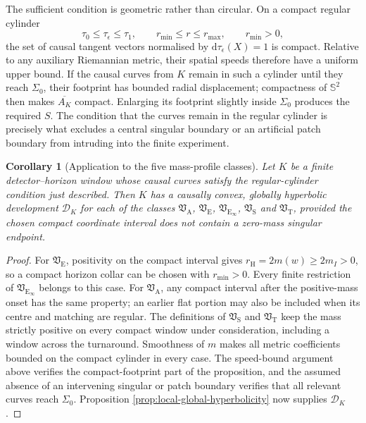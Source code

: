 \documentclass[11pt,a4paper]{article}
\newtheorem{corollary}[theorem]{Corollary}
\theoremstyle{definition}
\theoremstyle{remark}
\newcommand{\D}{\mathcal D}
\newcommand{\dd}{\mathrm d}
\begin{document}
	The sufficient condition is geometric rather than circular.  On a compact
	regular cylinder
	\begin{equation}
		\tau_0\leq\tau_\epsilon\leq\tau_1,
		\qquad r_{\min}\leq r\leq r_{\max},
		\qquad r_{\min}>0,
		\label{eq:regular-causal-cylinder}
	\end{equation}
	the set of causal tangent vectors normalised by
	$\dd\tau_\epsilon(X)=1$ is compact.  Relative to any auxiliary Riemannian
	metric, their spatial speeds therefore have a uniform upper bound.  If the
	causal curves from $K$ remain in such a cylinder until they reach
	$\Sigma_0$, their footprint has bounded radial displacement; compactness of
	$\mathbb S^2$ then makes $\overline{A_K}$ compact.  Enlarging its footprint
	slightly inside $\Sigma_0$ produces the required $S$.  The condition that
	the curves remain in the regular cylinder is precisely what excludes a
	central singular boundary or an artificial patch boundary from intruding
	into the finite experiment.
	
	\begin{corollary}[Application to the five mass-profile classes]
		\label{cor:mass-class-hyperbolicity}
		Let $K$ be a finite detector--horizon window whose causal curves satisfy the
		regular-cylinder condition just described.  Then $K$ has a causally convex,
		globally hyperbolic development $\D_K$ for each of the classes
		$\mathfrak V_{\mathrm A}$, $\mathfrak V_{\mathrm E}$,
		$\mathfrak V_{\mathrm E_\infty}$, $\mathfrak V_{\mathrm S}$ and
		$\mathfrak V_{\mathrm T}$, provided the chosen compact coordinate interval
		does not contain a zero-mass singular endpoint.
	\end{corollary}
	
	\begin{proof}
		For $\mathfrak V_{\mathrm E}$, positivity on the compact interval gives
		$r_{\mathrm H}=2m(w)\geq2m_I>0$, so a compact horizon collar can be chosen
		with $r_{\min}>0$.  Every finite restriction of
		$\mathfrak V_{\mathrm E_\infty}$ belongs to this case.  For
		$\mathfrak V_{\mathrm A}$, any compact interval after the positive-mass onset
		has the same property; an earlier flat portion may also be included when its
		centre and matching are regular.  The definitions of
		$\mathfrak V_{\mathrm S}$ and $\mathfrak V_{\mathrm T}$ keep the mass
		strictly positive on every compact window under consideration, including a
		window across the turnaround.  Smoothness of $m$ makes all metric
		coefficients bounded on the compact cylinder in every case.  The speed-bound
		argument above verifies the compact-footprint part of the proposition, and
		the assumed absence of an intervening singular or patch boundary verifies
		that all relevant curves reach $\Sigma_0$.  Proposition
		\ref{prop:local-global-hyperbolicity} now supplies $\D_K$.
	\end{proof}
	
\end{document}
